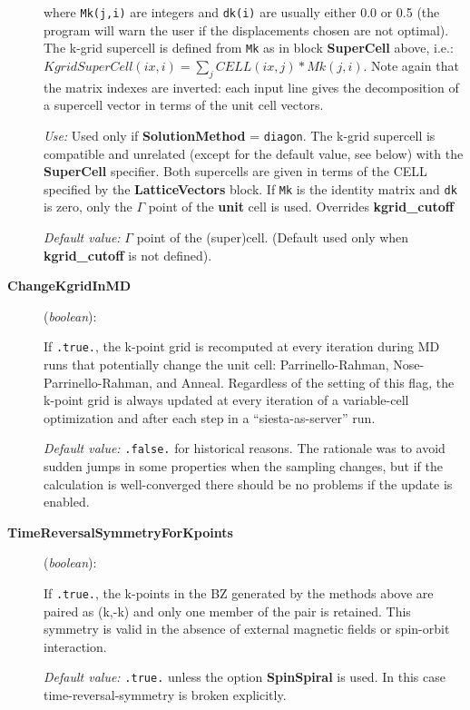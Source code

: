 \documentclass[11pt]{article}
\begin{document}
\begin{description}
where {\tt Mk(j,i)} are integers and {\tt dk(i)} are usually
either 0.0 or 0.5 (the program will warn the user if the displacements
chosen are not optimal).
The k-grid supercell is defined from {\tt Mk}
as in block {\bf SuperCell} above, i.e.:
$KgridSuperCell(ix,i) = \sum_j CELL(ix,j)*Mk(j,i)$.
Note again that the matrix indexes are inverted: each input line
gives the decomposition of a supercell vector in terms of the unit
cell vectors.


{\it Use:} Used only if {\bf SolutionMethod} = {\tt diagon}.
The k-grid supercell is compatible and unrelated
(except for the default value, see below)
with the {\bf SuperCell} specifier. Both supercells are given in
terms of the CELL specified by the {\bf LatticeVectors} block.
If {\tt Mk} is the identity matrix and {\tt dk}
is zero, only the $\Gamma$ point of the {\bf unit} cell is used.
Overrides {\bf kgrid\_cutoff}

{\it Default value:} $\Gamma$ point of the (super)cell.
(Default used only when {\bf kgrid\_cutoff} is not defined).

\item[{\bf ChangeKgridInMD}] ({\it boolean}):

If {\tt .true.}, the k-point grid is
recomputed at every iteration during MD runs that potentially
change the unit cell: Parrinello-Rahman, Nose-Parrinello-Rahman, and
Anneal. Regardless of the setting of this flag, the k-point grid
is always updated at every iteration of a variable-cell optimization
and after each step in a ``siesta-as-server'' run.

{\it Default value:} {\tt .false.} for historical reasons. The
rationale was to avoid sudden jumps in some properties when the
sampling changes, but if the calculation is well-converged there
should be no problems if the update is enabled.

\item[{\bf TimeReversalSymmetryForKpoints}] ({\it boolean}):

If {\tt .true.}, the k-points in the BZ generated by the methods above
are paired as (k,-k) and only one member of the pair is retained. This
symmetry is valid in the absence of external magnetic fields or
spin-orbit interaction.

{\it Default value:} {\tt .true.} unless the option {\bf SpinSpiral} 
is used. In this case time-reversal-symmetry is broken explicitly.

\end{description}
\end{document}
